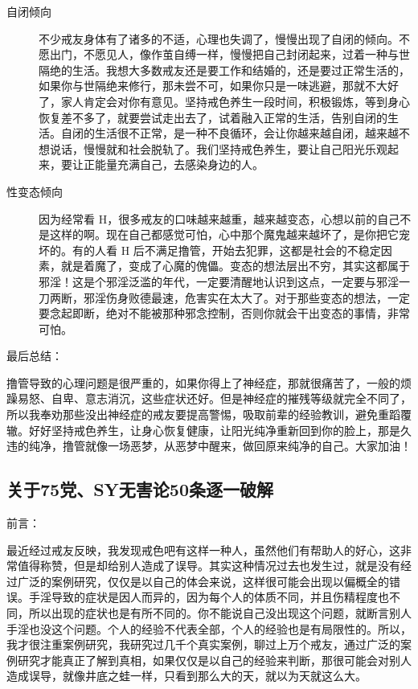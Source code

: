 \documentclass{ctexart}
\begin{document}
\begin{description}
    \item[自闭倾向] 不少戒友身体有了诸多的不适，心理也失调了，慢慢出现了自闭的倾向。不愿出门，不愿见人，像作茧自缚一样，慢慢把自己封闭起来，过着一种与世隔绝的生活。我想大多数戒友还是要工作和结婚的，还是要过正常生活的，如果你与世隔绝来修行，那未尝不可，如果你只是一味逃避，那就不大好了，家人肯定会对你有意见。坚持戒色养生一段时间，积极锻炼，等到身心恢复差不多了，就要尝试走出去了，试着融入正常的生活，告别自闭的生活。自闭的生活很不正常，是一种不良循环，会让你越来越自闭，越来越不想说话，慢慢就和社会脱轨了。我们坚持戒色养生，要让自己阳光乐观起来，要让正能量充满自己，去感染身边的人。
    \item[性变态倾向] 因为经常看 H，很多戒友的口味越来越重，越来越变态，心想以前的自己不是这样的啊。现在自己都感觉可怕，心中那个魔鬼越来越坏了，是你把它宠坏的。有的人看 H 后不满足撸管，开始去犯罪，这都是社会的不稳定因素，就是着魔了，变成了心魔的傀儡。变态的想法层出不穷，其实这都属于邪淫！这是个邪淫泛滥的年代，一定要清醒地认识到这点，一定要与邪淫一刀两断，邪淫伤身败德最速，危害实在太大了。对于那些变态的想法，一定要念起即断，绝对不能被那种邪念控制，否则你就会干出变态的事情，非常可怕。
\end{description}

最后总结：

撸管导致的心理问题是很严重的，如果你得上了神经症，那就很痛苦了，一般的烦躁易怒、自卑、意志消沉，这些症状还好。但是神经症的摧残等级就完全不同了，所以我奉劝那些没出神经症的戒友要提高警惕，吸取前辈的经验教训，避免重蹈覆辙。好好坚持戒色养生，让身心恢复健康，让阳光纯净重新回到你的脸上，那是久违的纯净，撸管就像一场恶梦，从恶梦中醒来，做回原来纯净的自己。大家加油！

\subsection{关于75党、SY无害论50条逐一破解}

前言：

最近经过戒友反映，我发现戒色吧有这样一种人，虽然他们有帮助人的好心，这非常值得称赞，但是却给别人造成了误导。其实这种情况过去也发生过，就是没有经过广泛的案例研究，仅仅是以自己的体会来说，这样很可能会出现以偏概全的错误。手淫导致的症状是因人而异的，因为每个人的体质不同，并且伤精程度也不同，所以出现的症状也是有所不同的。你不能说自己没出现这个问题，就断言别人手淫也没这个问题。个人的经验不代表全部，个人的经验也是有局限性的。所以，我才很注重案例研究，我研究过几千个真实案例，聊过上万个戒友，通过广泛的案例研究才能真正了解到真相，如果仅仅是以自己的经验来判断，那很可能会对别人造成误导，就像井底之蛙一样，只看到那么大的天，就以为天就这么大。
\end{document}

